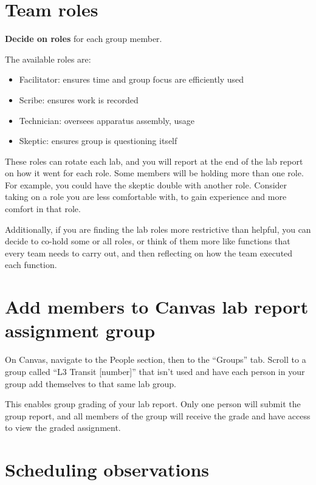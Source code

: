 \section{Team roles}

\begin{steps}
	\item \textbf{Decide on roles} for each group member.
\end{steps}

The available roles are:
\begin{itemize}
	\item Facilitator: ensures time and group focus are efficiently used
	\item Scribe: ensures work is recorded
	\item Technician: oversees apparatus assembly, usage
	\item Skeptic: ensures group is questioning itself
\end{itemize}

These roles can rotate each lab, and you will report at the end of the lab report on how it went for each role. Some members will be holding more than one role. For example, you could have the skeptic double with another role. Consider taking on a role you are less comfortable with, to gain experience and more comfort in that role.

Additionally, if you are finding the lab roles more restrictive than helpful, you can decide to co-hold some or all roles, or think of them more like functions that every team needs to carry out, and then reflecting on how the team executed each function.

\section{Add members to Canvas lab report assignment group}

\begin{steps}
	\item On Canvas, navigate to the People section, then to the ``Groups'' tab. Scroll to a group called ``L3 Transit [number]'' that isn't used and have each person in your group add themselves to that same lab group.
\end{steps}

This enables group grading of your lab report. Only one person will submit the group report, and all members of the group will receive the grade and have access to view the graded assignment.

\section{Scheduling observations}

